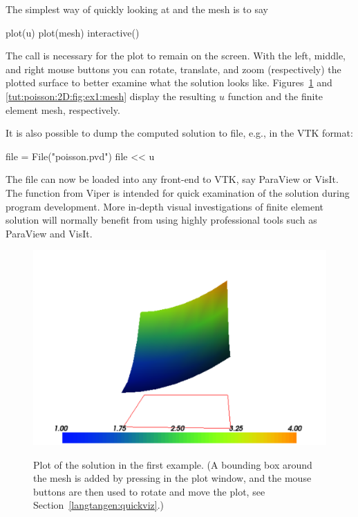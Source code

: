 The simplest way of quickly looking at  and the mesh
is to say
\begin{python}
plot(u)
plot(mesh)
interactive()
\end{python}
The  call is necessary for the plot to remain on the
screen. With the left, middle, and right
mouse buttons you can rotate, translate, and zoom
(respectively) the plotted surface to better examine what the solution looks
like.
Figures~\ref{tut:poisson:2D:fig:ex1:u} and
\ref{tut:poisson:2D:fig:ex1:mesh} display the resulting $u$
function and the finite element mesh, respectively.

It is also possible to dump the computed solution to file, e.g., in the
VTK format:
\begin{python}
file = File("poisson.pvd")
file << u
\end{python}

The  file can now be loaded
into any front-end to VTK, say ParaView or VisIt. The
 function from Viper is intended
for quick examination of the solution during program development.
More in-depth visual investigations of finite element solution will
normally benefit from using highly professional tools such as ParaView
and VisIt.

\begin{figure}
  \begin{center}
    \label{tut:poisson:2D:fig:ex1:u}
    \includegraphics[width=\largefig]{chapters/langtangen/pdf/ex1_u.pdf}
    \caption{Plot of the solution in the first \fenics{} example.
      (A bounding box around the mesh is added by pressing  in the plot
      window, and the mouse buttons are then used to rotate and move the
      plot, see Section~\ref{langtangen:quickviz}.)}
  \end{center}
\end{figure}

